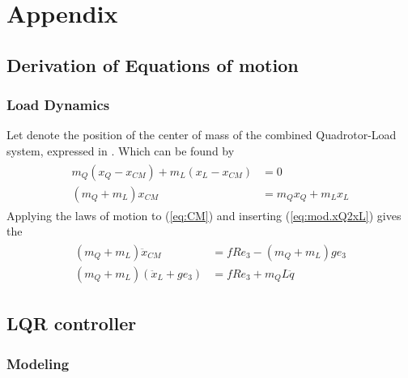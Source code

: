 \chapter{Appendix}

\section{Derivation of Equations of motion}
\subsection{Load Dynamics}\label{sec:app.loaddyn}

Let  denote the position of the center of mass of the combined Quadrotor-Load system, expressed in \IF. Which can be found by
\begin{align}\label{eq:CM}
\begin{split}
m_Q(x_Q-x_{CM})+m_L(x_L-x_{CM})&=0\\
(m_Q+m_L)x_{CM}&=m_Qx_Q+m_Lx_L
\end{split}
\end{align}
Applying the laws of motion to (\ref{eq:CM}) and inserting (\ref{eq:mod.xQ2xL}) gives the 
\begin{align}\label{key}
\begin{split}
(m_Q+m_L)\ddot{x}_{CM}&=fRe_3 - (m_Q+m_L)ge_3\\
(m_Q+m_L)(\ddot{x}_L+ge_3)&= fRe_3+m_QL\ddot{q}
\end{split}
\end{align}



\section{LQR controller}\label{app:lqr}

\subsection{Modeling}
%

